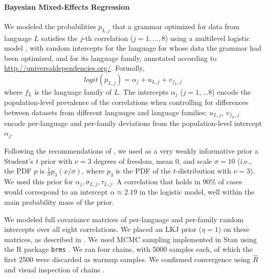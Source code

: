 \documentclass[10pt,twoside,lineno]{article}
\begin{document}
\paragraph{Bayesian Mixed-Effects Regression}
We modeled the probabilities $p_{L,j}$ that a grammar optimized for data from language $L$ satisfies the $j$-th correlation ($j=1,...,8$) using a multilevel logistic model \cite{gelman2013bayesian}, with random intercepts for the language for whose data the grammar had been optimized, and for its language family, annotated according to \url{http://universaldependencies.org/}.
Formally,
\begin{equation}\label{eq:mixed-effects}
logit(p_{L,j}) = \alpha_j + u_{L,j} + v_{f_L,j}
\end{equation}
where $f_L$ is the language family of $L$.
The intercepts $\alpha_j$ ($j=1,...8$) encode the population-level prevalence of the correlations when controlling for differences between datasets from different languages and language families; $u_{L,j}$, $v_{f_L,j}$ encode per-language and per-family deviations from the population-level intercept $\alpha_j$.



Following the recommendations of \cite{ghosh2018use, burkner2018advanced}, we used as a very weakly informative prior a Student's $t$ prior with $\nu=3$ degrees of freedom, mean 0, and scale $\sigma=10$ (i.e., the PDF $p$ is $\frac{1}{\sigma} p_3(x/\sigma)$, where $p_3$ is the PDF of the $t$-distribution with $\nu=3$).
We used this prior for $\alpha_j, \sigma_{L,j}, \tau_{L,j}$.
A correlation that holds in 90\% of cases would correspond to an intercept $\alpha \approx 2.19$ in the logistic model, well within the main probability mass of the prior.

We modeled full covariance matrices of per-language and per-family random intercepts over all eight correlations. We placed an LKJ prior ($\eta=1$) on these matrices, as described in \cite{burkner2018advanced}.
We used MCMC sampling implemented in Stan \cite{carpenter2017stan, hoffman2014no} using the R package \texttt{brms} \cite{buerkner2017brms}.
We ran four chains, with 5000 samples each, of which the first 2500 were discarded as warmup samples.
We confirmed convergence using $\hat{R}$ and visual inspection of chains \cite{gelman2013bayesian}.
\end{document}
